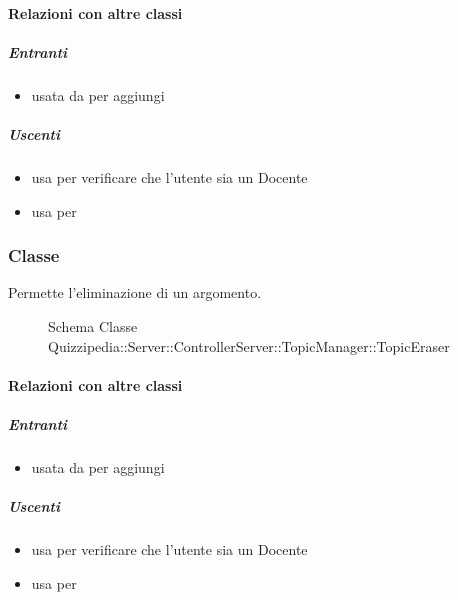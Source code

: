\paragraph{Relazioni con altre classi}
\subparagraph{Entranti}
\begin{itemize}
\item usata da  per aggiungi
\end{itemize}
\subparagraph{Uscenti}
\begin{itemize}
\item usa  per verificare che l'utente sia un Docente
\item usa  per 
\end{itemize}
\subsubsection{Classe }
Permette l'eliminazione di un argomento.
\begin{figure}[H]
\centering
\noindent{}
\caption[Schema Classe TopicEraser]{Schema Classe Quizzipedia::Server::ControllerServer::TopicManager::TopicEraser}
\end{figure}
\paragraph{Relazioni con altre classi}
\subparagraph{Entranti}
\begin{itemize}
\item usata da  per aggiungi
\end{itemize}
\subparagraph{Uscenti}
\begin{itemize}
\item usa  per verificare che l'utente sia un Docente
\item usa  per 
\end{itemize}
